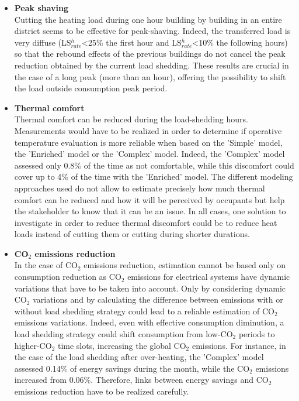 \documentclass[buildings,article,submit,moreauthors,pdftex,10pt,a4paper]{mdpi}
\theoremstyle{mdpi}
\newcounter{ex}
\newcounter{re}
\theoremstyle{mdpidefinition}
\begin{document}
\begin{itemize}[leftmargin=*,labelsep=4mm]
    \item \textbf{Peak shaving}\\
    Cutting the heating load during one hour building by building in an entire district seems to be effective for peak-shaving. Indeed, the transferred load is very diffuse (LS$_{rate}^{h}$<25\% the first hour and LS$_{rate}^{h}$<10\% the following hours) so that the rebound effects of the previous buildings do not cancel the peak reduction obtained by the current load shedding. These results are crucial in the case of a long peak (more than an hour), offering the possibility to shift the load outside consumption peak period.\\
    \item \textbf{Thermal comfort}\\
    Thermal comfort can be reduced during the load-shedding hours. Measurements would have to be realized in order to determine if operative temperature evaluation is more reliable when based on the 'Simple' model, the 'Enriched' model or the 'Complex' model. Indeed, the 'Complex' model assessed only 0.8\% of the time as not comfortable, while this discomfort could cover up to 4\% of the time with the 'Enriched' model. The different modeling approaches used do not allow to estimate precisely how much thermal comfort can be reduced and how it will be perceived by occupants but help the stakeholder to know that it can be an issue. In all cases, one solution to investigate in order to reduce thermal discomfort could be to reduce heat loads instead of cutting them or cutting during shorter durations.\\
    \item \textbf{CO$_{2}$ emissions reduction}\\
    In the case of CO$_2$ emissions reduction, estimation cannot be based only on consumption reduction as CO$_2$ emissions for electrical systems have dynamic variations that have to be taken into account. Only by considering dynamic CO$_{2}$ variations and by calculating the difference between emissions with or without load shedding strategy could lead to a reliable estimation of CO$_{2}$ emissions variations. Indeed, even with effective consumption diminution, a load shedding strategy could shift consumption from low-CO$_{2}$ periods to higher-CO$_{2}$ time slots, increasing the global CO$_{2}$ emissions. For instance, in the case of the load shedding after over-heating, the 'Complex' model assessed 0.14\% of energy savings during the month, while the CO$_{2}$ emissions increased from 0.06\%. Therefore, links between energy savings and CO$_{2}$ emissions reduction have to be realized carefully.
\end{itemize}
\end{document}
